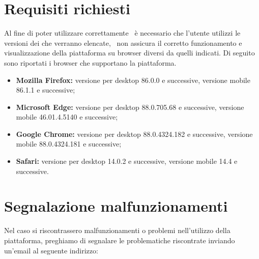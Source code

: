 \section{Requisiti richiesti}\label{Requisiti}
Al fine di poter utilizzare correttamente \NomeProgetto\ è necessario che l'utente utilizzi le versioni dei  che verranno elencate, \Gruppo\ non assicura il corretto funzionamento e visualizzazione della piattaforma su browser diversi da quelli indicati.
Di seguito sono riportati i browser che supportano la piattaforma.
\begin{itemize}
	\item \textbf{Mozilla Firefox:} versione per desktop 86.0.0 e successive, versione mobile 86.1.1 e successive;
	\item \textbf{Microsoft Edge:} versione per desktop 88.0.705.68 e successive, versione mobile 46.01.4.5140 e successive;
	\item \textbf{Google Chrome:} versione per desktop 88.0.4324.182 e successive, versione mobile 88.0.4324.181 e successive;
	\item \textbf{Safari:} versione per desktop 14.0.2 e successive, versione mobile 14.4 e successive.
\end{itemize}
\section{Segnalazione malfunzionamenti}\label{Malfunzionamenti}
Nel caso si riscontrassero malfunzionamenti o problemi nell'utilizzo della piattaforma, preghiamo di segnalare le problematiche riscontrate inviando un'email al seguente indirizzo:
\begin{center}
	\href{mailto:\Mail}{\Mail}
\end{center}